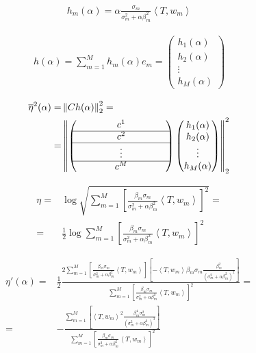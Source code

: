 \documentclass[a4paper,10pt]{article}
\theoremstyle{plain}
\theoremstyle{definition}
\theoremstyle{remark}
\newcommand{\obar}[1]{\overline{#1}}
\newcommand{\pa}[1]{\left(#1\right)}
\newcommand{\ang}[1]{\left<#1\right>}
\newcommand{\bra}[1]{\left[#1\right]}
\newcommand{\norm}[1]{\left\|#1\right\|}
\begin{document}
\begin{align*}
  h_m (\alpha) = \alpha \frac{\sigma _m}{ \sigma _m ^2 + \alpha
      \beta _m ^2 } \ang{T,w_m} 
\end{align*}

\begin{align*}
  h(\alpha) = \sum _{m=1} ^M h_m (\alpha) e_m = \begin{pmatrix}
    h_1 (\alpha) \\
    h_2 (\alpha) \\
    \vdots\\
    h_M (\alpha)
    \end{pmatrix}
\end{align*}

\begin{align*}
   \obar{\eta}^2(\alpha ) = & \norm{ C h(\alpha) } _2 ^2 =\\
   = & \norm{ \begin{pmatrix}
     & & & & c^1 & & & & \\
     \hline
     & & & & c^2 & & & & \\
     \hline
     & & & & \vdots & & & & \\
     \hline
     & & & & c^M & & & &
     \end{pmatrix} 
     \begin{pmatrix}
    h_1 (\alpha) \\
    h_2 (\alpha) \\
    \vdots\\
    h_M (\alpha)
    \end{pmatrix}
    } _2 ^2
\end{align*}

\begin{align*}
  \eta = & \log \sqrt{ \sum _{m=1} ^M \bra{ \frac{ \beta _m \sigma
        _m}{\sigma _m ^2 + \alpha \beta _m ^2} \ang{T,w_m} } ^2 } =
  \\
  = & \frac{1}{2} \log \sum _{m=1} ^M \bra{ \frac{ \beta _m \sigma
      _m}{\sigma _m ^2 + \alpha \beta _m ^2} \ang{T,w_m} } ^2
\end{align*}

\begin{align*}
  \eta ' (\alpha) = & \frac{1}{2} \frac{2 \sum _{m=1} ^M \bra{\frac{
        \beta _m \sigma _m}{\sigma _m ^2 + \alpha \beta _m ^2}
      \ang{T,w_m}}\bra{- \ang{T,w_m} \beta _m \sigma _m \frac{\beta_m
        ^2}{\pa{ \sigma _m ^2 + \alpha \beta _m ^2} ^{2} }} }{ \sum
    _{m=1} ^M \bra{ \frac{ \beta _m \sigma _m}{\sigma _m ^2 +
        \alpha \beta _m ^2} \ang{T,w_m} } ^2} = \\
  = & - \frac{ \sum _{m=1} ^M \bra{\ang{T,w_m}^2 \frac{ \beta _m ^4
        \sigma _m ^2 }{\pa{\sigma _m ^2 + \alpha \beta _m ^2} ^3 } }}
  { \sum _{m=1} ^M \bra{ \frac{ \beta _m \sigma _m}{\sigma _m ^2 +
        \alpha \beta _m ^2} \ang{T,w_m} } ^2} \\
\end{align*}
\end{document}
